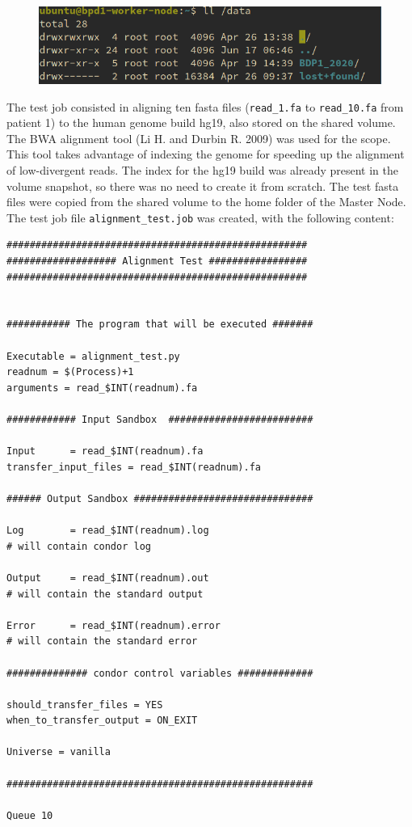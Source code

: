 \documentclass{article}
\begin{document}
\begin{figure}[!h]
    \center
    \includegraphics[width=.8\textwidth]{./images/nfs_bdp_works.png}
\end{figure}

The test job consisted in aligning ten fasta files (\texttt{read\_1.fa} to \texttt{read\_10.fa} from patient 1) to the human genome build hg19, also stored on the shared volume.
The BWA alignment tool (Li H. and Durbin R. 2009) was used for the scope.
This tool takes advantage of indexing the genome for speeding up the alignment of low-divergent reads.
The index for the hg19 build was already present in the volume snapshot, so there was no need to create it from scratch.
The test fasta files were copied from the shared volume to the home folder of the Master Node.
The test job file \texttt{alignment\_test.job} was created, with the following content:

\begin{lstlisting}
####################################################
################### Alignment Test #################
####################################################


########### The program that will be executed #######

Executable = alignment_test.py
readnum = $(Process)+1
arguments = read_$INT(readnum).fa

############ Input Sandbox  #########################

Input      = read_$INT(readnum).fa
transfer_input_files = read_$INT(readnum).fa

###### Output Sandbox ###############################

Log        = read_$INT(readnum).log
# will contain condor log

Output     = read_$INT(readnum).out
# will contain the standard output

Error      = read_$INT(readnum).error
# will contain the standard error

############## condor control variables #############

should_transfer_files = YES
when_to_transfer_output = ON_EXIT

Universe = vanilla

#####################################################

Queue 10
\end{lstlisting}
\end{document}
